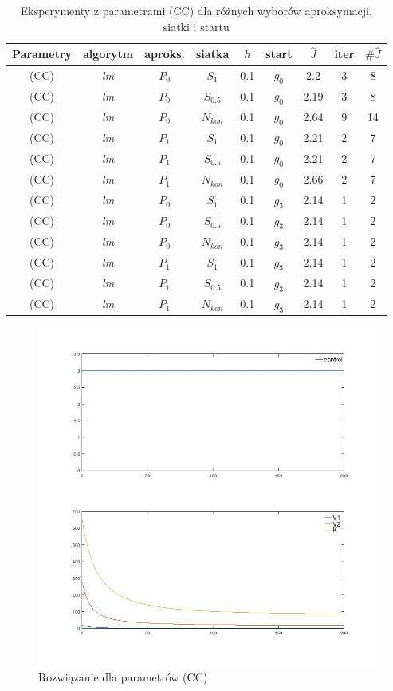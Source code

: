 \documentclass[11pt]{article}
\begin{document}
\begin{table}[h]
  \begin{center}
    \begin{tabular}{|c|c|c|c|c|c|c|c|c|}
      \hline
      Parametry & algorytm & aproks. & siatka & $h$ & start & $\hat{J}$ & iter & $\#\hat{J}$ \\
      \hline
      (CC) & {\it lm\/} & $P_0$ & $S_1$ & 0.1 & $g_0$ & 2.2 & 3 & 8 \\
      \hline
      (CC) & {\it lm\/} & $P_0$ & $S_{0.5}$ & 0.1 & $g_0$ & 2.19 & 3 & 8 \\
      \hline
      (CC) & {\it lm\/} & $P_0$ & $N_{kon}$ & 0.1 & $g_0$ & 2.64 & 9 & 14 \\
      \hline
      (CC) & {\it lm\/} & $P_1$ & $S_1$ & 0.1 & $g_0$ & 2.21 & 2 & 7 \\
      \hline
      (CC) & {\it lm\/} & $P_1$ & $S_{0.5}$ & 0.1 & $g_0$ & 2.21 & 2 & 7 \\
      \hline
      (CC) & {\it lm\/} & $P_1$ & $N_{kon}$ & 0.1 & $g_0$ & 2.66 & 2 & 7 \\
      \hline
      (CC) & {\it lm\/} & $P_0$ & $S_1$ & 0.1 & $g_3$ & 2.14 & 1 & 2 \\
      \hline
      (CC) & {\it lm\/} & $P_0$ & $S_{0.5}$ & 0.1 & $g_3$ & 2.14 & 1 & 2 \\
      \hline
      (CC) & {\it lm\/} & $P_0$ & $N_{kon}$ & 0.1 & $g_3$ & 2.14 & 1 & 2 \\
      \hline
      (CC) & {\it lm\/} & $P_1$ & $S_1$ & 0.1 & $g_3$ & 2.14 & 1 & 2 \\
      \hline
      (CC) & {\it lm\/} & $P_1$ & $S_{0.5}$ & 0.1 & $g_3$ & 2.14 & 1 & 2 \\
      \hline
      (CC) & {\it lm\/} & $P_1$ & $N_{kon}$ & 0.1 & $g_3$ & 2.14 & 1 & 2 \\
      \hline
    \end{tabular}
    \caption{Eksperymenty z parametrami (CC) dla różnych wyborów aproksymacji, siatki i startu}\label{param1_tbl}
  \end{center}
\end{table}

\begin{figure}[h]
  \centering
  \includegraphics[width=.5\textwidth]{../plots/plot_max}
  \caption{Rozwiązanie dla parametrów (CC)}\label{max_plot}
\end{figure}
\end{document}
